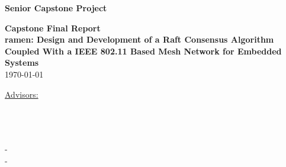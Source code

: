 \begin{titlepage}

 \begin{center}
 \textbf{\large Senior Capstone Project}
       \vspace*{\fill}

        \textbf {Capstone Final Report\\}
        \vspace{10pt}
        \textbf {\large ramen: Design and Development of a Raft Consensus Algorithm \\Coupled With a IEEE 802.11 Based Mesh Network for Embedded Systems\\}
        \vspace{10pt}
        \today
      
        \vfill
            
     \underline {Advisors:}\\
       \advisorOneName\\
       \advisorTwoName\\
       
            
       \vspace{0.8cm}
     
            
       \underline {\group}\\
       \studentOneName - \studentOneEmail\\
       \studentTwoName - \studentTwoEmail\\
      
            
   \end{center}
\end{titlepage}